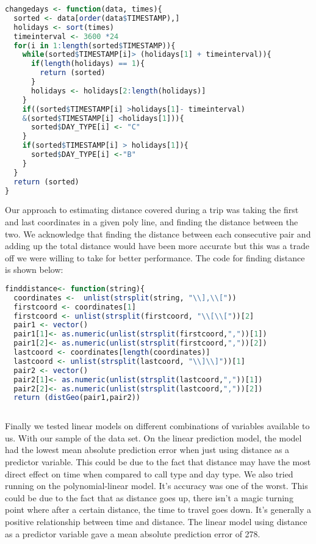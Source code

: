 \documentclass{article}
\begin{document}
\begin{lstlisting}[language=R]
changedays <- function(data, times){
  sorted <- data[order(data$TIMESTAMP),]
  holidays <- sort(times)
  timeinterval <- 3600 *24
  for(i in 1:length(sorted$TIMESTAMP)){
    while(sorted$TIMESTAMP[i]> (holidays[1] + timeinterval)){ 
      if(length(holidays) == 1){
        return (sorted)
      }
      holidays <- holidays[2:length(holidays)]  
    }
    if((sorted$TIMESTAMP[i] >holidays[1]- timeinterval)
    &(sorted$TIMESTAMP[i] <holidays[1])){ 
      sorted$DAY_TYPE[i] <- "C"
    }
    if(sorted$TIMESTAMP[i] > holidays[1]){
      sorted$DAY_TYPE[i] <-"B"
    }
  }
  return (sorted)
}
\end{lstlisting}
Our approach to estimating distance covered during a trip was taking the first and last coordinates in a given poly line, and finding the distance between the two. We acknowledge that finding the distance between each consecutive pair and adding up the total distance would have been more accurate but this was a trade off we were willing to take for better performance. The code for finding distance is shown below:
\begin{lstlisting}[language=R]
finddistance<- function(string){ 
  coordinates <-  unlist(strsplit(string, "\\],\\["))
  firstcoord <- coordinates[1]
  firstcoord <- unlist(strsplit(firstcoord, "\\[\\["))[2]
  pair1 <- vector()
  pair1[1]<- as.numeric(unlist(strsplit(firstcoord,","))[1])
  pair1[2]<- as.numeric(unlist(strsplit(firstcoord,","))[2])
  lastcoord <- coordinates[length(coordinates)]
  lastcoord <- unlist(strsplit(lastcoord, "\\]\\]"))[1]
  pair2 <- vector()
  pair2[1]<- as.numeric(unlist(strsplit(lastcoord,","))[1])
  pair2[2]<- as.numeric(unlist(strsplit(lastcoord,","))[2])
  return (distGeo(pair1,pair2))
  
\end{lstlisting}
Finally we tested linear models on different combinations of variables available to us. With our sample of the data set. On the linear prediction model, the model had the lowest mean absolute prediction error when just using distance as a predictor variable. This could be due to the fact that distance may have the most direct effect on time when compared to call type and day type. We also tried running on the polynomial-linear model. It's accuracy was one of the worst. This could be due to the fact that as distance goes up, there isn't a magic turning point where after a certain distance, the time to travel goes down. It's generally a positive relationship between time and distance. The linear model using distance as a predictor variable gave a mean absolute prediction error of 278.
\end{document}
